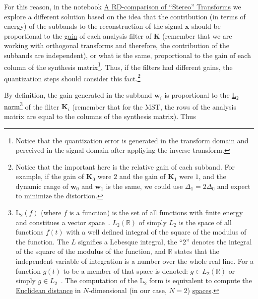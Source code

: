 For this reason, in the notebook
\href{https://github.com/Tecnologias-multimedia/Tecnologias-multimedia.github.io/blob/master/study_guide/transform_coding/stereo_transforms_RD.ipynb}{A
  RD-comparison of ``Stereo'' Transforms} we explore a different
solution based on the idea that the contribution (in terms of
energy) of the subbands to the reconstruction of the signal
${\mathbf x}$ should be proportional to the
\href{https://en.wikipedia.org/wiki/Filter_(signal_processing)}{gain}
of each analysis filter of ${\mathbf K}$ (remember that we are working
with orthogonal transforms and therefore, the contribution of the
subbands are independent), or what is the same, proportional to the
gain of each column of the synthesis matrix\footnote{Notice that the
  quantization error is generated in the transform domain and
  perceived in the signal domain after appliying the inverse
  transform.}. Thus, if the filters had different gains, the
quantization steps should consider this fact.\footnote{Notice that the
  important here is the relative gain of each subband. For example, if
  the gain of ${\mathbf K}_0$ were $2$ and the gain of ${\mathbf K}_1$
  were $1$, and the dynamic range of ${\mathbf w}_0$ and
  ${\mathbf w}_1$ is the same, we could use $\Delta_1=2\Delta_0$ and
  expect to minimize the distortion.}

By definition, the gain generated in the subband ${\mathbf w}_i$ is
proportional to the
\href{https://en.wikipedia.org/wiki/Lp_space}{L$_2$
  norm}\footnote{L$_2(f)$ (where $f$ is a function) is the set of all
  functions with finite energy and constitues a vector
  space~\cite{sayood2017introduction}. $L_2({\mathbb R})$ of simply
  $L_2$ is the space of all functions $f(t)$ with a well defined
  integral of the square of the modulus of the function. The $L$
  signifies a Lebesque integral, the ``2'' denotes the integral of the
  square of the modulus of the function, and ${\mathbb R}$ states that
  the independent variable of integration is a number over the whole
  real line. For a function $g(t)$ to be a member of that space is
  denoted: $g\in L_2({\mathbb R})$ or simply
  $g\in L_2$~\cite{burrus2013wavelets}. The computation of the L$_2$
  form is equivalent to compute the
  \href{https://en.wikipedia.org/wiki/Euclidean_distance}{Euclidean
    distance} in $N$-dimensional (in our case, $N=2$)
  \href{https://en.wikipedia.org/wiki/Vector_space}{spaces}.} of the
filter ${\mathbf K}_i$ (remember that for the MST, the rows of the
analysis matrix are equal to the columns of the synthesis
matrix). Thus

